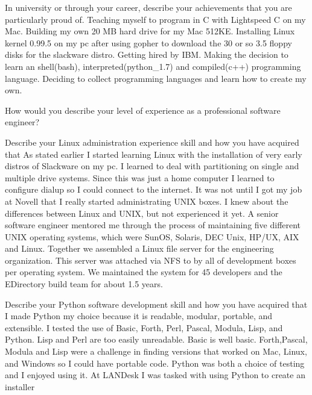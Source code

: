 \documentclass[11pt, a4paper]{awesome-cv}
\begin{document}
\makecvheader

\makelettertitle



In university or through your career, describe your achievements that you are particularly proud of.
Teaching myself to program in C with Lightspeed C on my Mac.
Building my own 20 MB hard drive for my Mac 512KE.
Installing Linux kernel 0.99.5 on my pc after using gopher to download the 30 or so 3.5 floppy disks for the slackware distro.
Getting hired by IBM.
Making the decision to learn an shell(bash), interpreted(python_1.7) and compiled(c++) programming language.
Deciding to collect programming languages and learn how to create my own.


How would you describe your level of experience as a professional software engineer?


Describe your Linux administration experience skill and how you have acquired that
As stated earlier I started learning Linux with the installation of very early distros of Slackware on my pc. I learned to deal with partitioning on single and multiple drive systems. Since this was just a home computer I learned to configure dialup so I could connect to the internet. It was not until I got my job at Novell that I really started administrating UNIX boxes. I knew about the differences between Linux and UNIX, but not experienced it yet. A senior software engineer mentored me through the process of maintaining five different UNIX operating systems, which were SunOS, Solaris, DEC Unix, HP/UX, AIX and Linux. Together we assembled a Linux file server for the engineering organization. This server was attached via NFS to by all of development boxes per operating system. We maintained the system for 45 developers and the EDirectory build team for about 1.5 years. 


Describe your Python software development skill and how you have acquired that
I made Python my choice because it is readable, modular, portable, and extensible. I tested the use of Basic, Forth, Perl, Pascal, Modula, Lisp, and Python. Lisp and Perl are too easily unreadable. Basic is well basic. Forth,Pascal, Modula and Lisp were a challenge in finding versions that worked on Mac, Linux, and Windows so I could have portable code. Python was both a choice of testing and I enjoyed using it. 
At LANDesk I was tasked with using Python to create an installer 
\end{document}
